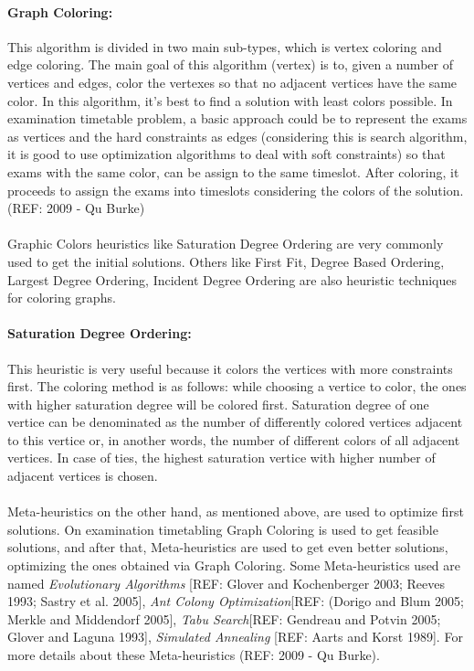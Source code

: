 \paragraph{Graph Coloring:}
This algorithm is divided in two main sub-types, which is vertex coloring and edge coloring. The main goal of this algorithm (vertex) is to, given a number of vertices and edges, color the vertexes so that no adjacent vertices have the same color. In this algorithm, it's best to find a solution with least colors possible. In examination timetable problem, a basic approach could be to represent the exams as vertices and the hard constraints as edges (considering this is search algorithm, it is good to use optimization algorithms to deal with soft constraints) so that exams with the same color, can be assign to the same timeslot. After coloring, it proceeds to assign the exams into timeslots considering the colors of the solution. (REF: 2009 - Qu Burke)\\
\\
Graphic Colors heuristics like Saturation Degree Ordering are very commonly used to get the initial solutions. Others like First Fit, Degree Based Ordering, Largest Degree Ordering, Incident Degree Ordering are also heuristic techniques for coloring graphs.
\\
\paragraph{Saturation Degree Ordering:}
This heuristic is very useful because it colors the vertices with more constraints first. The coloring method is as follows: while choosing a vertice to color, the ones with higher saturation degree will be colored first. Saturation degree of one vertice can be denominated as the number of differently colored vertices adjacent to this vertice or, in another words, the number of different colors of all adjacent vertices. In case of ties, the highest saturation vertice with higher number of adjacent vertices is chosen.\\
\\
Meta-heuristics on the other hand, as mentioned above, are used to optimize first solutions. On examination timetabling Graph Coloring is used to get feasible solutions, and after that, Meta-heuristics are used to get even better solutions, optimizing the ones obtained via Graph Coloring. Some Meta-heuristics used are named \textit{Evolutionary Algorithms} [REF: Glover and Kochenberger 2003; Reeves 1993; Sastry et al. 2005], \textit{Ant Colony Optimization}[REF: (Dorigo and Blum 2005; Merkle and Middendorf 2005], \textit{Tabu Search}[REF: Gendreau and Potvin 2005; Glover and Laguna 1993], \textit{Simulated Annealing} [REF: Aarts and Korst 1989]. For more details about these Meta-heuristics (REF: 2009 - Qu Burke).\\
\\

